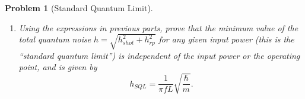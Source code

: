 \documentclass{article}
\newtheorem{plm}{Problem}
\begin{document}
\begin{plm}[Standard Quantum Limit]
\begin{enumerate}
    $\lambda = \SI{1064}{nm}$, $L = \SI{4}{km}$, for three different input powers: \SI{40}{W}, \SI{40}{kW}, \SI{40}{MW},
    for frequencies between \SI{0.1}{Hz} and $\SI{1}{kHz}$ (assume the pendulums are very, very long, with resonance frequencies below \SI{0.1}{Hz}).
    At what frequencies do each of the sums have their minimum value, and what is the minimum value?
  \item Using the expressions in previous parts, prove that the minimum value of the total quantum noise $h = \sqrt{h_{shot}^{2} + h_{rp}^{2}}$
    for any given input power (this is the ``standard quantum limit'') is independent of the input power or the operating point, and is given by
    \[
      h_{SQL} = \frac{1}{\pi fL}\sqrt{\frac{\hbar}{m}}.
    \]
  \end{enumerate}
\end{plm}
\end{document}
